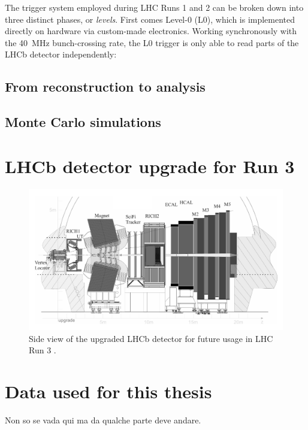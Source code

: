 The trigger system employed during LHC Runs 1 and 2 can be broken down into three distinct phases, or \textit{levels}.
First comes Level-0 (L0), which is implemented directly on hardware via custom-made electronics.
Working synchronously with the \SI{40}{\mega\hertz} bunch-crossing rate, the L0 trigger is only able to read parts of the LHCb detector independently: 

\subsection{From reconstruction to analysis}

\subsection{Monte Carlo simulations}



\section{LHCb detector upgrade for Run 3}

\begin{figure}[t]
	\centering
	\includegraphics[width=\textwidth]{graphics/02-lhcb/lhcb_diagram_run3.png}
	\caption[LHCb detector side view (Run 3).]{Side view of the upgraded LHCb detector for future usage in LHC Run 3 \cite{Piucci_2017}.}
	\label{fig:2:lhcb_diagram_run3}
\end{figure}

\section{Data used for this thesis}
Non so se vada qui ma da qualche parte deve andare.